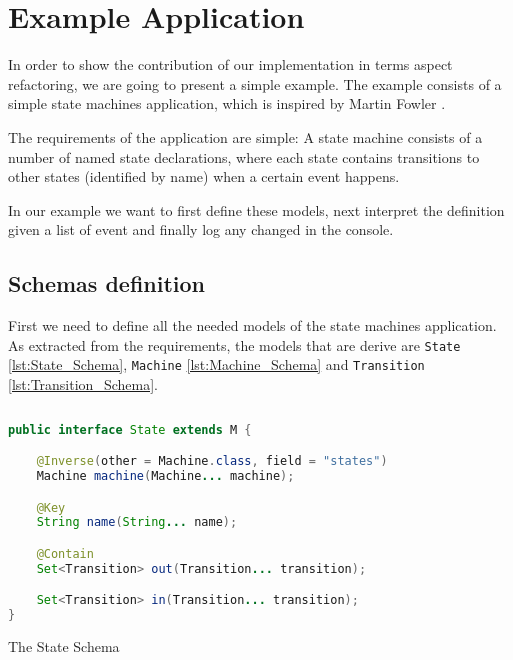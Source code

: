 
\chapter{Example Application}\label{Example Application}
In order to show the contribution of our implementation in terms aspect refactoring, we are going to present a simple example.
The example consists of a simple state machines application, which is inspired by Martin Fowler \cite{fowler2010domain}.

The requirements of the application are simple: A state machine consists of a number of named state declarations, where each state contains transitions to other states (identified by name) when a certain event happens.

In our example we want to first define these models, next interpret the definition given a list of event and finally log any changed in the console.

\section{Schemas definition}
First we need to define all the needed models of the state machines application. As extracted from the requirements, the models that are derive are \texttt{State} \ref{lst:State_Schema}, \texttt{Machine} \ref{lst:Machine_Schema} and \texttt{Transition} \ref{lst:Transition_Schema}.

\begin{sourcecode}
	\label{lst:State_Schema}
	\begin{lstlisting}[language=Java]
public interface State extends M {

    @Inverse(other = Machine.class, field = "states")
    Machine machine(Machine... machine);

    @Key
    String name(String... name);

    @Contain
    Set<Transition> out(Transition... transition);

    Set<Transition> in(Transition... transition);
}
	\end{lstlisting}
	\caption{The State Schema}
\end{sourcecode}

